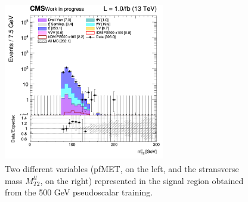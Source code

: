 \documentclass[a4paper, 10pt, openright]{report}
\begin{document}
\begin{figure}[htbp]
{\begin{minipage}[b]{.48\textwidth}
\end{minipage}\hfill
\begin{minipage}[b]{.48\textwidth}
\includegraphics[width=7cm, height=7cm]{figs/2017/SRBlinded-ttDM-pseudo500/log_cratio_topCR_ll_BDT_ttDM500_mt2ll.png}
\end{minipage} \hfill
}
\caption{Two different variables (pf\ac{MET}, on the left, and the stransverse mass $M_{T2}^{ll}$, on the right) represented in the signal region obtained from the 500 GeV pseudoscalar training.}
\label{fig:SR4}
\end{figure}
\end{document}
